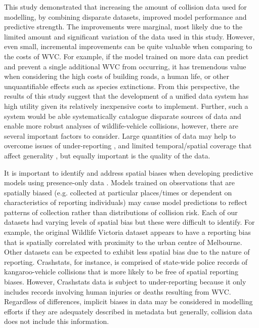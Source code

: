 This study demonstrated that increasing the amount of collision data used for modelling, by combining disparate datasets, improved model performance and predictive strength. The improvements were marginal, most likely due to the limited amount and significant variation of the data used in this study. However, even small, incremental improvements can be quite valuable when comparing to the costs of WVC. For example, if the model trained on more data can predict and prevent a single additional WVC from occurring, it has tremendous value when considering the high costs of building roads, a human life, or other unquantifiable effects such as species extinctions. From this perspective, the results of this study suggest that the development of a unified data system has high utility given its relatively inexpensive costs to implement. Further, such a system would be able systematically catalogue disparate sources of data and enable more robust analyses of wildlife-vehicle collisions, however, there are several important factors to consider. Large quantities of data may help to overcome issues of under-reporting \citep[see][]{snow15}, and limited temporal/spatial coverage that affect generality \citep[see][]{clev15}, but equally important is the quality of the data.

It is important to identify and address spatial biases when developing predictive models using presence-only data \citep{kram13}. Models trained on observations that are spatially biased (e.g. collected at particular places/times or dependent on characteristics of reporting individuals) may cause model predictions to reflect patterns of collection rather than distributions of collision risk. Each of our datasets had varying levels of spatial bias but these were difficult to identify. For example, the original Wildlife Victoria dataset appears to have a reporting bias that is spatially correlated with proximity to the urban centre of Melbourne. Other datasets can be expected to exhibit less spatial bias due to the nature of reporting. Crashstats, for instance, is comprised of state-wide police records of kangaroo-vehicle collisions that is more likely to be free of spatial reporting biases. However, Crashstats data is subject to under-reporting because it only includes records involving human injuries or deaths resulting from WVC.  Regardless of differences, implicit biases in data may be considered in modelling efforts if they are adequately described in metadata \citep[see][]{wart13} but generally, collision data does not include this information.

